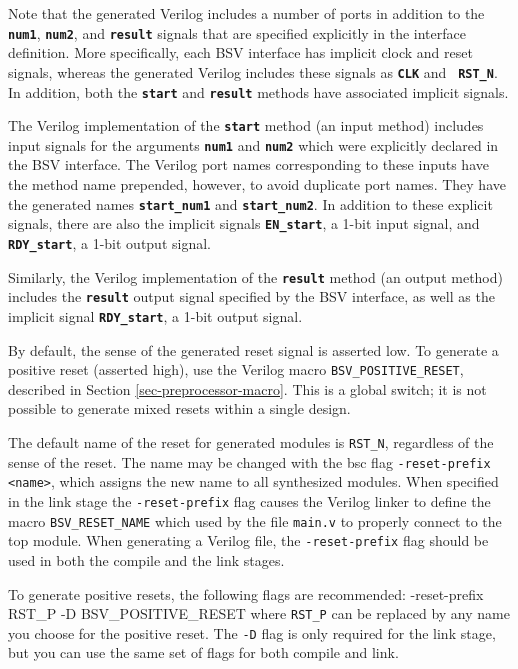 \documentclass{article}
\newcommand{\te}[1]{\texttt{#1}}
\newenvironment{centerboxverbatim}
  {\center
   \boxedverbatim}
  {\endboxedverbatim
  {\endcenter }}
\begin{document}
Note that the generated Verilog includes a number of ports in addition
to the {\bf\tt num1}, {\bf\tt num2}, and {\bf\tt result} signals that are
specified explicitly in the interface definition. More specifically,
each BSV interface has implicit clock and reset signals, whereas the
generated Verilog includes these signals as {\bf\tt CLK} and {\bf\tt
RST\_N}. In addition, both the {\bf\tt start} and {\bf\tt result} methods
have associated implicit signals.

The Verilog implementation of the {\bf\tt start} method (an
input method) includes input signals for the arguments {\bf\tt num1}
and {\bf\tt num2} which were explicitly declared in the BSV interface.
The Verilog port names corresponding to these inputs have the method
name prepended, however, to avoid duplicate port names.  They have
the generated names {\bf\tt start\_num1} and {\bf\tt start\_num2}.
In addition to these explicit signals, there are also the implicit
signals {\bf\tt EN\_start}, a 1-bit input signal, and {\bf\tt RDY\_start}, a
1-bit output signal.

Similarly, the Verilog implementation of the {\bf\tt result} method
(an output method) includes the {\bf\tt result} output signal specified by
the BSV interface, as well as the implicit signal {\bf\tt RDY\_start},
a 1-bit output signal.


By default, the sense of the generated reset signal is asserted low.
To generate a positive reset (asserted high), use the Verilog macro
\te{BSV\_POSITIVE\_RESET}, described in Section
\ref{sec-preprocessor-macro}.  This is a global switch; it is not
possible to generate mixed resets within a single design.

The default name of the reset for generated modules is \te{RST\_N}, regardless
of the sense of the reset.  The name may be changed with the bsc flag
\te{-reset-prefix <name>}, which assigns the new name to all
synthesized modules.  When specified in the link stage the
 \te{-reset-prefix} flag causes the Verilog
 linker to define  the macro
 \te{BSV\_RESET\_NAME} which
 used by the file \te{main.v} to properly connect to the top module.
 When generating a Verilog file, the \te{-reset-prefix} 
flag should be used in both the compile and the link stages.  

To generate  positive resets, the following flags are recommended:
\begin{centerboxverbatim}
-reset-prefix RST_P -D BSV_POSITIVE_RESET
\end{centerboxverbatim}
where \te{RST\_P} can be replaced by any name you choose for the
positive reset.  The \te{-D} flag is only required for the link stage,
but you can use the same set of flags for both compile and link.
\end{document}
